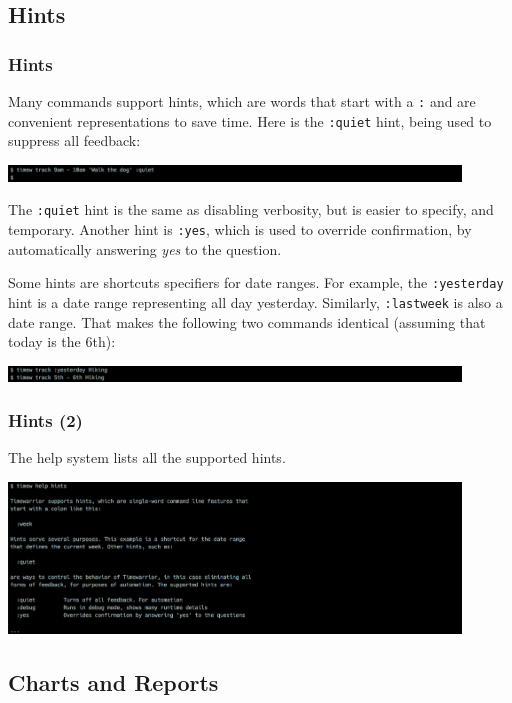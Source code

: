 \documentclass[t,handout]{beamer}
\begin{document}
\subsection{Hints}

\begin{frame}[fragile]\frametitle{Hints}
    Many commands support hints, which are words that start with a \verb=:= and are convenient representations to save time. Here is the \verb=:quiet= hint, being used to suppress all feedback:

    \includegraphics[width=12cm]{images/tutorial21.png}

    The \verb=:quiet= hint is the same as disabling verbosity, but is easier to specify, and temporary. Another hint is \verb=:yes=, which is used to override confirmation, by automatically answering \textit{yes} to the question.

    Some hints are shortcuts specifiers for date ranges. For example, the \verb=:yesterday= hint is a date range representing all day yesterday. Similarly, \verb=:lastweek= is also a date range. That makes the following two commands identical (assuming that today is the 6th):

    \includegraphics[width=12cm]{images/tutorial22.png}
\end{frame}

\begin{frame}[fragile]\frametitle{Hints (2)}
    The help system lists all the supported hints.

    \includegraphics[width=12cm]{images/tutorial23.png}
\end{frame}

\subsection{Charts and Reports}
\end{document}
